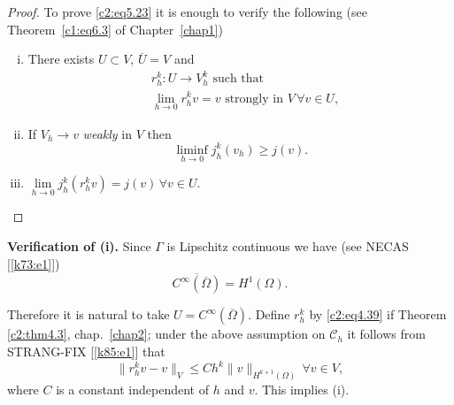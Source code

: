 \begin{proof}
To prove \eqref{c2:eq5.23} it is enough to verify the following (see
Theorem~\ref{c1:eq6.3} of Chapter~\ref{chap1}) 
\begin{enumerate}[(i)]
\item There exists $U \subset V$, $\overline{U} = V$ and
\begin{align*}
& r^k_h : U \to V^k_h \text{ such that }\\
& \lim_{h \to 0} r^k_h v = v \text{ strongly in } V\, \forall  v \in
  U, 
\end{align*}
\item If $V_h \to v$ {\em weakly } in $V$ then 
$$
\liminf_{h \to 0 }  j^k_h (v_h) \geq j (v).
$$
\item $\lim\limits_{h \to 0} j^k_h (r^k_h v) = j(v)\, \forall  v \in
  U$.\pageoriginale  
\end{enumerate} 
\end{proof}

\medskip
\noindent 
\textbf{Verification of (i). }%
 Since $\Gamma$ is Lipschitz continuous we have (see NECAS [\ref{k73:e1}])   
\begin{equation}
\overline{C^\infty (\overline{\Omega})} = H^1
(\Omega). \tag{5.24}\label{c2:eq5.24} 
\end{equation}


Therefore it is natural to take $U= C^\infty
(\overline{\Omega})$. Define $r^k_h$ by \eqref{c2:eq4.39} if Theorem \ref{c2:thm4.3},
chap.~\ref{chap2}; under the above assumption on $\mathscr{C}_h$ it follows from
STRANG-FIX [\ref{k85:e1}] that  
\begin{equation}
\parallel r^k_h v-v \parallel_V \leq C h^k \parallel  v \parallel_{H^{k +1} (\Omega)}\, \forall  v
\in V, \tag{5.25}\label{c2:eq5.25} 
\end{equation}
 where $C$ is a constant independent of $h$ and $v$. This implies (i).
 

